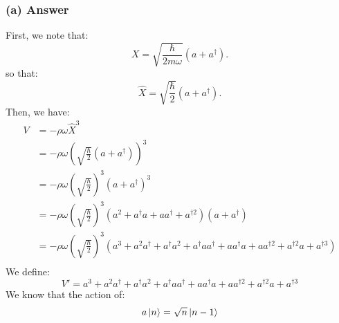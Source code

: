 \documentclass{article}
\begin{document}
\subsubsection*{(a) Answer}
First, we note that:
\begin{equation}
    X = \sqrt{\frac{\hbar}{2m\omega}}(a + a^\dagger).
\end{equation}
so that:
\begin{equation}
    \hat{X} = \sqrt{\frac{\hbar}{2}}(a + a^\dagger).
\end{equation}
Then, we have:
\begin{align}
    V &= -\rho \omega \hat{X}^3 \\
    &= -\rho \omega \left( \sqrt{\frac{\hbar}{2}}(a + a^\dagger) \right)^3 \\
    &= -\rho \omega \left( \sqrt{\frac{\hbar}{2}} \right)^3 (a + a^\dagger)^3 \\
    &= -\rho \omega \left( \sqrt{\frac{\hbar}{2}} \right)^3 (a^2 + a^\dagger a + aa^\dagger + a^{\dagger 2}) (a + a^\dagger) \\
    &= -\rho \omega \left( \sqrt{\frac{\hbar}{2}} \right)^3 (a^3 + a^2a^\dagger + a^{\dagger}a^2 + a^{\dagger}aa^{\dagger} + aa^{\dagger}a + aa^{\dagger 2} + a^{\dagger 2}a + a^{\dagger 3}) \\
\end{align}
We define:
\begin{equation}
    V' = a^3 + a^2a^\dagger + a^{\dagger}a^2 + a^{\dagger}aa^{\dagger} + aa^{\dagger}a + aa^{\dagger 2} + a^{\dagger 2}a + a^{\dagger 3}
\end{equation}
We know that the action of:
\begin{equation}
    a\ket{n} = \sqrt{n}\ket{n-1}
\end{equation}
\end{document}
